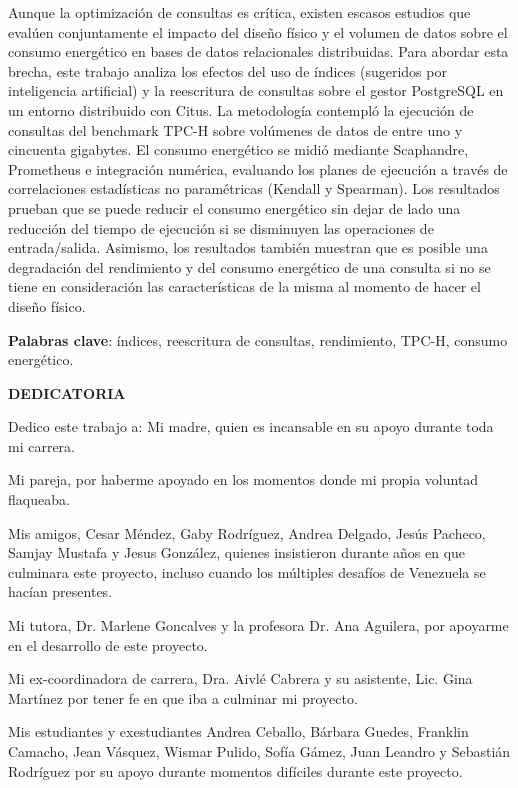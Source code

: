 \documentclass[12pt, letter paper]{report}
\begin{document}
  Aunque la optimización de consultas es crítica, existen escasos estudios que
  evalúen conjuntamente el impacto del diseño físico y el volumen de datos sobre
  el consumo energético en bases de datos relacionales distribuidas. Para
  abordar esta brecha, este trabajo analiza los efectos del uso de índices
  (sugeridos por inteligencia artificial) y la reescritura de consultas sobre el
  gestor PostgreSQL en un entorno distribuido con Citus. La metodología
  contempló la ejecución de consultas del benchmark TPC-H sobre volúmenes de
  datos de entre uno y cincuenta gigabytes. El consumo energético se midió
  mediante Scaphandre, Prometheus e integración numérica, evaluando los planes
  de ejecución a través de correlaciones estadísticas no paramétricas (Kendall y
  Spearman). Los resultados prueban que se puede reducir el consumo energético
  sin dejar de lado una reducción del tiempo de ejecución si se disminuyen las
  operaciones de entrada/salida. Asimismo, los resultados también muestran que
  es posible una degradación del rendimiento y del consumo energético de una
  consulta si no se tiene en consideración las características de la misma al
  momento de hacer el diseño físico.

  \textbf{Palabras clave}: índices, reescritura de consultas, rendimiento,
  TPC-H, consumo energético.

  \newpage
  
  \begin{center}
    \large \textbf{DEDICATORIA}
  \end{center}

  Dedico este trabajo a:
  Mi madre, quien es incansable en su apoyo durante toda mi carrera.

  Mi pareja, por haberme apoyado en los momentos donde mi propia voluntad
  flaqueaba.

  Mis amigos, Cesar Méndez, Gaby Rodríguez, Andrea Delgado, Jesús Pacheco,
  Samjay Mustafa y Jesus González, quienes insistieron durante años en que
  culminara este proyecto, incluso cuando los múltiples desafíos de Venezuela se
  hacían presentes.

  Mi tutora, Dr. Marlene Goncalves y la profesora Dr. Ana Aguilera, por apoyarme
  en el desarrollo de este proyecto.

  Mi ex-coordinadora de carrera, Dra. Aivlé Cabrera y su asistente, Lic. Gina
  Martínez por tener fe en que iba a culminar mi proyecto.

  Mis estudiantes y exestudiantes Andrea Ceballo, Bárbara Guedes, Franklin
  Camacho, Jean Vásquez, Wismar Pulido, Sofía Gámez, Juan Leandro y Sebastián
  Rodríguez por su apoyo durante momentos difíciles durante este proyecto.
\end{document}
